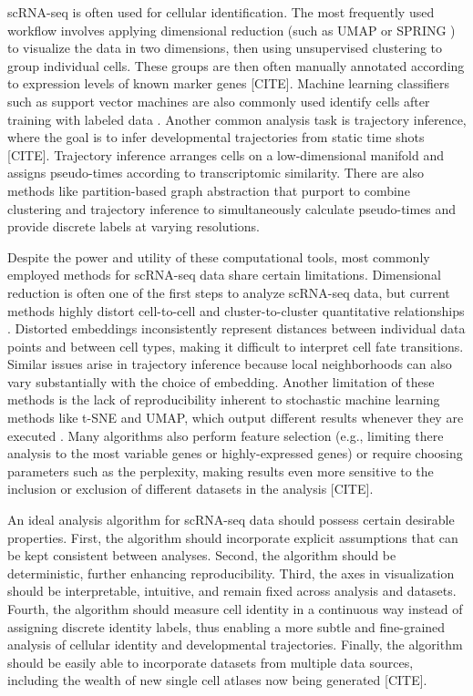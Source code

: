 \documentclass[aps,superscriptaddress, notitlepage,longbibliography]{revtex4-1}
\begin{document}
scRNA-seq is often used for cellular identification. The most frequently used workflow involves applying dimensional reduction (such as UMAP \cite{mcinnes_umap_2018} or SPRING \cite{weinreb_spring_2018}) to visualize the data in two dimensions, then using unsupervised clustering to group individual cells. These groups are then often manually annotated according to expression levels of known marker genes [CITE]. Machine learning classifiers such as support vector machines are also commonly used identify cells after training with labeled data \cite{abdelaal_comparison_2019}. Another common analysis task is trajectory inference, where the goal is to infer developmental trajectories from static time shots [CITE]. Trajectory inference arranges cells on a low-dimensional manifold and assigns pseudo-times according to transcriptomic similarity. There are also methods like partition-based graph abstraction \cite{wolf_paga_2019} that purport to combine clustering and trajectory inference to simultaneously calculate pseudo-times and provide discrete labels at varying resolutions. 

Despite the power and utility of these computational tools, most commonly employed methods for scRNA-seq data share certain limitations. Dimensional reduction is often one of the first steps to analyze scRNA-seq data, but current methods highly distort cell-to-cell and cluster-to-cluster quantitative relationships \cite{chari_specious_2021}. Distorted embeddings inconsistently represent distances between individual data points and between cell types, making it difficult to interpret cell fate transitions. Similar issues arise in trajectory inference because  local neighborhoods can also vary substantially with the choice of embedding. Another limitation of these methods is the lack of reproducibility inherent to stochastic machine learning methods like t-SNE and UMAP, which output different results whenever they are executed  \cite{wattenberg_how_2016}. Many algorithms also perform feature selection (e.g., limiting there analysis to the most variable genes or highly-expressed genes) or require choosing parameters such as the perplexity, making results even more sensitive to the inclusion or exclusion of different datasets in the analysis [CITE].

An ideal analysis algorithm for scRNA-seq data should possess certain desirable properties. 
First, the algorithm should incorporate explicit assumptions that can be kept consistent between analyses. Second, the algorithm should be deterministic, further enhancing reproducibility. Third, the axes in visualization should be interpretable, intuitive, and remain fixed across analysis and datasets. Fourth, the algorithm should measure cell identity in a continuous way instead of assigning discrete identity labels, thus enabling a more subtle and fine-grained analysis of cellular identity and developmental trajectories. Finally, the algorithm should be easily able to incorporate datasets from multiple data sources, including the wealth of new single cell atlases now being generated [CITE].
\end{document}
